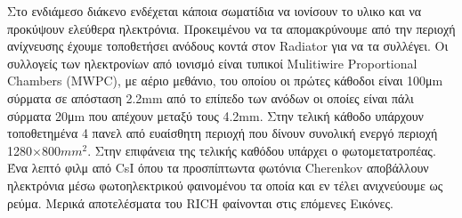  	Στο ενδιάμεσο διάκενο ενδέχεται κάποια σωματίδια να ιονίσουν το υλικο και να προκύψουν ελεύθερα ηλεκτρόνια. Προκειμένου να τα απομακρύνουμε από την περιοχή ανίχνευσης έχουμε τοποθετήσει ανόδους κοντά στον Radiator για να τα συλλέγει.
 	Oι συλλογείς των ηλεκτρονίων από ιονισμό είναι τυπικοί Mulitiwire Proportional Chambers (MWPC), με αέριο μεθάνιο, του οποίου οι πρώτες κάθοδοι είναι 100μm σύρματα σε απόσταση 2.2mm από το επίπεδο των ανόδων οι οποίες είναι πάλι σύρματα 20μm που απέχουν μεταξύ τους 4.2mm. 
 	Στην τελική κάθοδο υπάρχουν τοποθετημένα 4 πανελ από ευαίσθητη περιοχή που δίνουν συνολική ενεργό περιοχή 1280$\times 800mm^2$. Στην επιφάνεια της τελικής καθόδου υπάρχει ο φωτομετατροπέας. Ένα λεπτό φιλμ από CsI όπου τα προσπίπτωντα φωτόνια Cherenkov αποβάλλουν ηλεκτρόνια μέσω φωτοηλεκτρικού φαινομένου τα οποία και εν τέλει ανιχνεύουμε ως ρεύμα. Μερικά αποτελέσματα του RICH φαίνονται στις επόμενες Εικόνες.
 	

